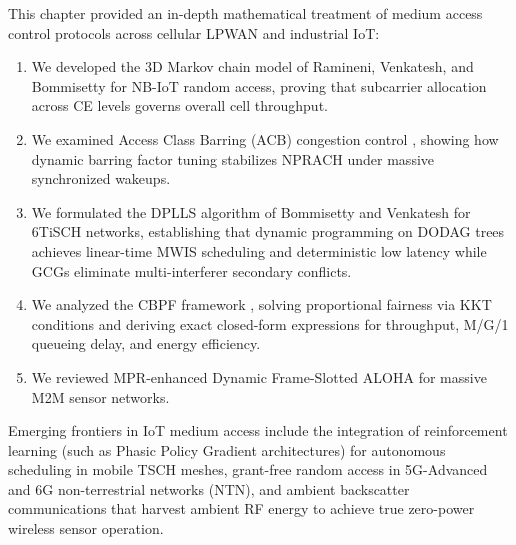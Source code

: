 This chapter provided an in-depth mathematical treatment of medium access control protocols across cellular LPWAN and industrial IoT:
\begin{enumerate}
    \item We developed the 3D Markov chain model of Ramineni, Venkatesh, and Bommisetty \cite{ramineni2022performance} for NB-IoT random access, proving that subcarrier allocation across CE levels governs overall cell throughput.
    \item We examined Access Class Barring (ACB) congestion control \cite{ramineni2019impact}, showing how dynamic barring factor tuning stabilizes NPRACH under massive synchronized wakeups.
    \item We formulated the DPLLS algorithm of Bommisetty and Venkatesh \cite{bommisetty2022dplls} for 6TiSCH networks, establishing that dynamic programming on DODAG trees achieves linear-time MWIS scheduling and deterministic low latency while GCGs eliminate multi-interferer secondary conflicts.
    \item We analyzed the CBPF framework \cite{bommisetty2023cbpf}, solving proportional fairness via KKT conditions and deriving exact closed-form expressions for throughput, M/G/1 queueing delay, and energy efficiency.
    \item We reviewed MPR-enhanced Dynamic Frame-Slotted ALOHA \cite{george2018performance, george2020multipacket} for massive M2M sensor networks.
\end{enumerate}

Emerging frontiers in IoT medium access include the integration of reinforcement learning (such as Phasic Policy Gradient architectures) for autonomous scheduling in mobile TSCH meshes, grant-free random access in 5G-Advanced and 6G non-terrestrial networks (NTN), and ambient backscatter communications that harvest ambient RF energy to achieve true zero-power wireless sensor operation.
